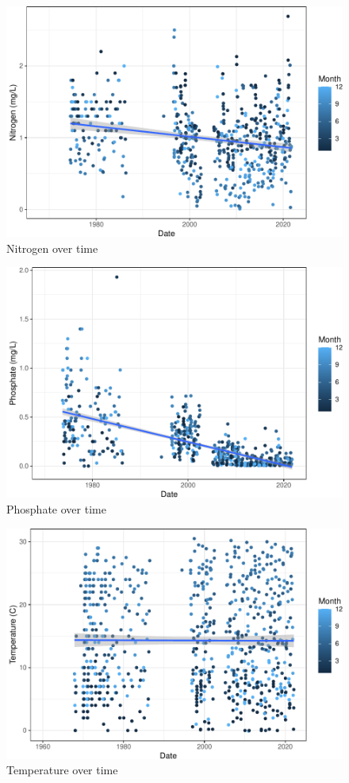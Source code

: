 \documentclass[
  12pt,
]{article}
\begin{document}
\begin{figure}
\centering
\includegraphics{Project_Template_files/figure-latex/exploration_plot3-1.pdf}
\caption{Nitrogen over time}
\end{figure}

\begin{figure}
\centering
\includegraphics{Project_Template_files/figure-latex/exploration_plot4-1.pdf}
\caption{Phosphate over time}
\end{figure}

\begin{figure}
\centering
\includegraphics{Project_Template_files/figure-latex/exploration_plot5-1.pdf}
\caption{Temperature over time}
\end{figure}
\end{document}
